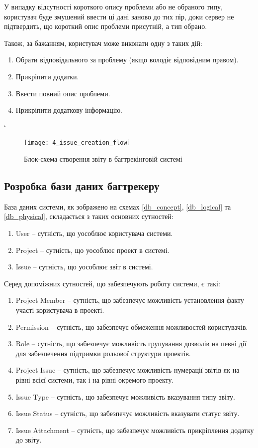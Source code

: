\documentclass[../main.tex]{subfiles}
\begin{document}
			У випадку відсутності короткого опису проблеми або не обраного типу, користувач буде змушений ввести ці дані заново до тих пір, доки сервер не підтвердить, що короткий опис проблеми присутній, а тип обрано.
			
			Також, за бажанням, користувач може виконати одну з таких дій:
			\begin{enumerate}
				\item Обрати відповідального за проблему (якщо володіє відповідним правом).
				\item Прикріпити додатки.
				\item Ввести повний опис проблеми.
				\item Прикріпити додаткову інформацію.
			\end{enumerate}
			`
			\begin{figure}[H]
				\centering
				\texttt{[image: 4\_issue\_creation\_flow]}
				\caption{Блок-схема створення звіту в багтрекінговій системі}
			\end{figure}

	\subsection{Розробка бази даних багтрекеру}
		База даних системи, як зображено на схемах \ref{db_concept}, \ref{db_logical} та \ref{db_physical}, складається з таких основних сутностей:
		\begin{enumerate}
			\item User -- сутність, що уособлює користувача системи.
			\item Project -- сутність, що уособлює проект в системі.
			\item Issue -- сутність, що уособлює звіт в системі.
		\end{enumerate}
		
		Серед допоміжних сутностей, що забезпечують роботу системи, є такі:
		\begin{enumerate}
			\item Project Member -- сутність, що забезпечує можливість установлення факту участі користувача в проекті.
			\item Permission -- сутність, що забезпечує обмеження можливостей користувачів.
			\item Role -- сутність, що забезпечує можливість групування дозволів на певні дії для забезпечення підтримки рольової структури проектів.
			\item Project Issue -- сутність, що забезпечує можливість нумерації звітів як на рівні всієї системи, так і на рівні окремого проекту.
			\item Issue Type -- сутність, що забезпечує можливість вказування типу звіту.
			\item Issue Status -- сутність, що забезпечує можливість вказувати статус звіту.
			\item Issue Attachment -- сутність, що забезпечує можливість прикріплення додатку до звіту.
		\end{enumerate}
		
\end{document}
